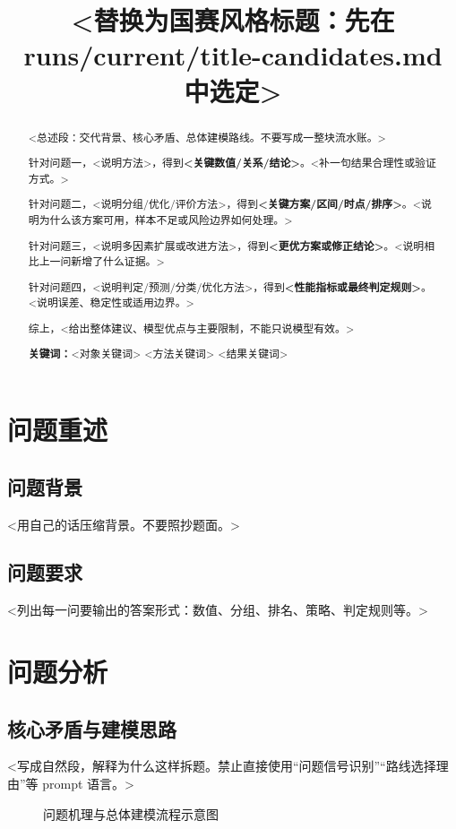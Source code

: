 \documentclass{ctexart}
\title{<替换为国赛风格标题：先在 runs/current/title-candidates.md 中选定>}
\author{}
\date{}
\newcommand{\keywords}[1]{\par\noindent\textbf{关键词：}#1}
\begin{document}
\maketitle

\begin{abstract}
<总述段：交代背景、核心矛盾、总体建模路线。不要写成一整块流水账。>

针对问题一，<说明方法>，得到\textbf{<关键数值/关系/结论>}。<补一句结果合理性或验证方式。>

针对问题二，<说明分组/优化/评价方法>，得到\textbf{<关键方案/区间/时点/排序>}。<说明为什么该方案可用，样本不足或风险边界如何处理。>

针对问题三，<说明多因素扩展或改进方法>，得到\textbf{<更优方案或修正结论>}。<说明相比上一问新增了什么证据。>

针对问题四，<说明判定/预测/分类/优化方法>，得到\textbf{<性能指标或最终判定规则>}。<说明误差、稳定性或适用边界。>

综上，<给出整体建议、模型优点与主要限制，不能只说模型有效。>

\keywords{<对象关键词> \quad <方法关键词> \quad <结果关键词>}
\end{abstract}

\section{问题重述}

\subsection{问题背景}
<用自己的话压缩背景。不要照抄题面。>

\subsection{问题要求}
<列出每一问要输出的答案形式：数值、分组、排名、策略、判定规则等。>

\section{问题分析}

\subsection{核心矛盾与建模思路}
<写成自然段，解释为什么这样拆题。禁止直接使用“问题信号识别”“路线选择理由”等 prompt 语言。>

\begin{figure}[H]
  \centering
  \caption{问题机理与总体建模流程示意图}
  \label{fig:concept}
\end{figure}
\end{document}
